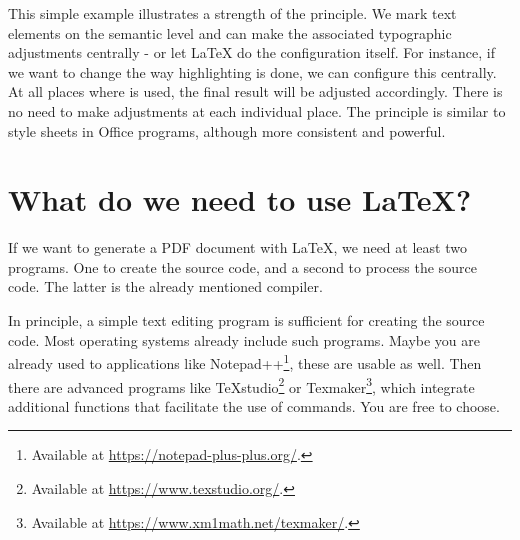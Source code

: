 
This simple example illustrates a strength of the  principle. 
We mark text elements on the semantic level and can make the associated typographic adjustments centrally - or let \LaTeX{} do the configuration itself.
For instance, if we want to change the way highlighting is done, we can configure this centrally. At all places where \texttt{\emph{}} is used, the final result will be adjusted accordingly. There is no need to make adjustments at each individual place. The principle is similar to style sheets in Office programs, although more consistent and powerful.


\section{What do we need to use \LaTeX{}?}
\label{subsec:what-we-need}

If we want to generate a PDF document with LaTeX, we need at least two programs. One to create the source code, and a second to process the source code. The latter is the already mentioned compiler.

In principle, a simple text editing program is sufficient for creating the source code. Most operating systems already include such programs. Maybe you are already used to applications like Notepad++\footnote{Available at \url{https://notepad-plus-plus.org/}.}, these are usable as well. Then there are advanced programs like TeXstudio\footnote{Available at \url{https://www.texstudio.org/}.} or Texmaker\footnote{Available at \url{https://www.xm1math.net/texmaker/}.}, which integrate additional functions that facilitate the use of commands. You are free to choose. 


